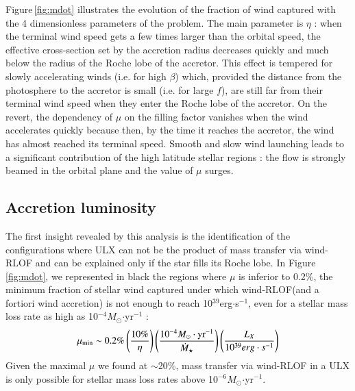 \documentclass[letter]{aa}
\makeatletter
\newcommand{\ulx}{ULX\xspace}
\newcommand*{\rlof}{RLOF\@\xspace}
\newcommand*{\ie}{i.e.\@\xspace}
\newcommand{\mystar}{{\fontfamily{lmr}\selectfont$\star$}}
\newcommand*{\msun}{$M_{\odot}$\@\xspace}
\newcommand*{\mdotstar}{$\dot{M}_{\text{\mystar}}$\@\xspace}
\makeatother
\begin{document}
Figure\,\ref{fig:mdot} illustrates the evolution of the fraction of wind captured with the 4 dimensionless parameters of the problem. The main parameter is $\eta$ : when the terminal wind speed gets a few times larger than the orbital speed, the effective cross-section set by the accretion radius decreases quickly and much below the radius of the Roche lobe of the accretor. This effect is tempered for slowly accelerating winds (\ie for high $\beta$) which, provided the distance from the photosphere to the accretor is small (\ie for large $f$), are still far from their terminal wind speed when they enter the Roche lobe of the accretor. On the revert, the dependency of $\mu$ on the filling factor vanishes when the wind accelerates quickly because then, by the time it reaches the accretor, the wind has almost reached its terminal speed. Smooth and slow wind launching leads to a significant contribution of the high latitude stellar regions : the flow is strongly beamed in the orbital plane and the value of $\mu$ surges. 



\subsection{Accretion luminosity}
\label{sec:}

The first insight revealed by this analysis is the identification of the configurations where \ulx can not be the product of mass transfer via wind-\rlof and can be explained only if the star fills its Roche lobe. In Figure\,\ref{fig:mdot}, we represented in black the regions where $\mu$ is inferior to 0.2\%, the minimum fraction of stellar wind captured under which wind-\rlof (and a fortiori wind accretion) is not enough to reach 10$^{39}$erg$\cdot$s$^{-1}$, even for a stellar mass loss rate as high as 10$^{-4}$\msun$\cdot$yr$^{-1}$ :
\begin{equation}
\mu_{\text{min}}\sim 0.2\%\left(\frac{10\%}{\eta}\right)\left(\frac{10^{-4}\text{\msun}\cdot\text{yr}^{-1}}{\text{\mdotstar}}\right)\left(\frac{L_X}{10^{39}erg\cdot s^{-1}}\right)
\label{eq:lim}
\end{equation} 
Given the maximal $\mu$ we found at $\sim$20\%, mass transfer via wind-\rlof in a \ulx is only possible for stellar mass loss rates above 10$^{-6}$\msun$\cdot$yr$^{-1}$.
\end{document}
